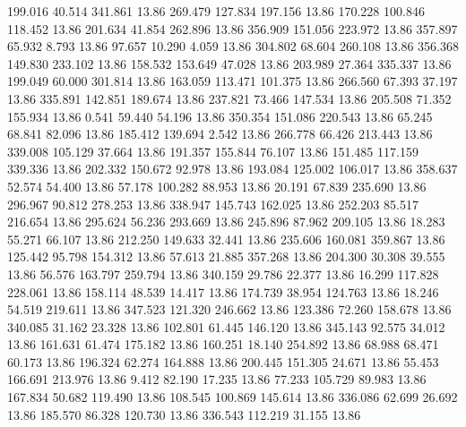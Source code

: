  199.016   40.514  341.861        13.86
 269.479  127.834  197.156        13.86
 170.228  100.846  118.452        13.86
 201.634   41.854  262.896        13.86
 356.909  151.056  223.972        13.86
 357.897   65.932    8.793        13.86
  97.657   10.290    4.059        13.86
 304.802   68.604  260.108        13.86
 356.368  149.830  233.102        13.86
 158.532  153.649   47.028        13.86
 203.989   27.364  335.337        13.86
 199.049   60.000  301.814        13.86
 163.059  113.471  101.375        13.86
 266.560   67.393   37.197        13.86
 335.891  142.851  189.674        13.86
 237.821   73.466  147.534        13.86
 205.508   71.352  155.934        13.86
   0.541   59.440   54.196        13.86
 350.354  151.086  220.543        13.86
  65.245   68.841   82.096        13.86
 185.412  139.694    2.542        13.86
 266.778   66.426  213.443        13.86
 339.008  105.129   37.664        13.86
 191.357  155.844   76.107        13.86
 151.485  117.159  339.336        13.86
 202.332  150.672   92.978        13.86
 193.084  125.002  106.017        13.86
 358.637   52.574   54.400        13.86
  57.178  100.282   88.953        13.86
  20.191   67.839  235.690        13.86
 296.967   90.812  278.253        13.86
 338.947  145.743  162.025        13.86
 252.203   85.517  216.654        13.86
 295.624   56.236  293.669        13.86
 245.896   87.962  209.105        13.86
  18.283   55.271   66.107        13.86
 212.250  149.633   32.441        13.86
 235.606  160.081  359.867        13.86
 125.442   95.798  154.312        13.86
  57.613   21.885  357.268        13.86
 204.300   30.308   39.555        13.86
  56.576  163.797  259.794        13.86
 340.159   29.786   22.377        13.86
  16.299  117.828  228.061        13.86
 158.114   48.539   14.417        13.86
 174.739   38.954  124.763        13.86
  18.246   54.519  219.611        13.86
 347.523  121.320  246.662        13.86
 123.386   72.260  158.678        13.86
 340.085   31.162   23.328        13.86
 102.801   61.445  146.120        13.86
 345.143   92.575   34.012        13.86
 161.631   61.474  175.182        13.86
 160.251   18.140  254.892        13.86
  68.988   68.471   60.173        13.86
 196.324   62.274  164.888        13.86
 200.445  151.305   24.671        13.86
  55.453  166.691  213.976        13.86
   9.412   82.190   17.235        13.86
  77.233  105.729   89.983        13.86
 167.834   50.682  119.490        13.86
 108.545  100.869  145.614        13.86
 336.086   62.699   26.692        13.86
 185.570   86.328  120.730        13.86
 336.543  112.219   31.155        13.86

